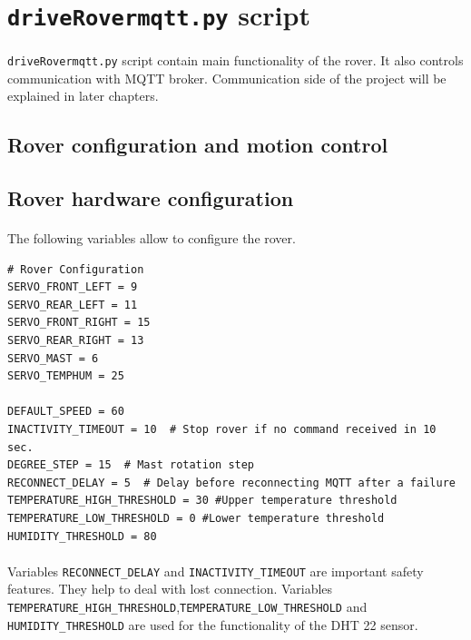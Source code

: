 \section{\lstinline|driveRovermqtt.py| script}
\paragraph{}\lstinline|driveRovermqtt.py| script contain main functionality of the rover. It also controls communication with MQTT broker. Communication side of the project will be explained in later chapters.

\subsection{Rover configuration and motion control}
\subsection{Rover hardware configuration}
\paragraph{} The following variables allow to configure the rover. 
\begin{lstlisting}[style=courier12]
# Rover Configuration
SERVO_FRONT_LEFT = 9
SERVO_REAR_LEFT = 11
SERVO_FRONT_RIGHT = 15
SERVO_REAR_RIGHT = 13
SERVO_MAST = 6
SERVO_TEMPHUM = 25

DEFAULT_SPEED = 60
INACTIVITY_TIMEOUT = 10  # Stop rover if no command received in 10 sec.
DEGREE_STEP = 15  # Mast rotation step
RECONNECT_DELAY = 5  # Delay before reconnecting MQTT after a failure
TEMPERATURE_HIGH_THRESHOLD = 30 #Upper temperature threshold
TEMPERATURE_LOW_THRESHOLD = 0 #Lower temperature threshold
HUMIDITY_THRESHOLD = 80
\end{lstlisting}
\vspace{-5mm}
\paragraph{} Variables \lstinline|RECONNECT_DELAY| and \lstinline|INACTIVITY_TIMEOUT| are important safety features. They help to deal with lost connection. Variables \lstinline|TEMPERATURE_HIGH_THRESHOLD|,\lstinline|TEMPERATURE_LOW_THRESHOLD| and \lstinline|HUMIDITY_THRESHOLD| are used for the functionality of the DHT 22 sensor.
